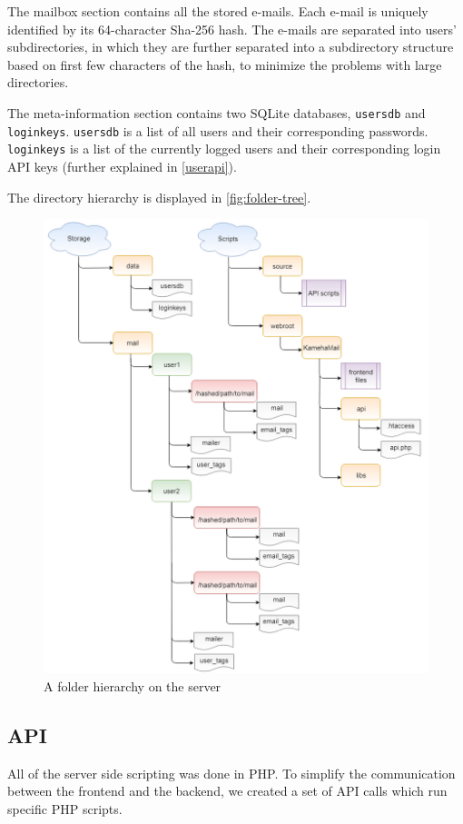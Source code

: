 The mailbox section contains all the stored e-mails. Each e-mail is uniquely identified by its 64-character Sha-256 hash. The e-mails are separated into users' subdirectories, in which they are further separated into a subdirectory structure based on first few characters of the hash, to minimize the problems with large directories.

The meta-information section contains two SQLite databases, \texttt{usersdb} and \texttt{loginkeys}. \texttt{usersdb} is a list of all users and their corresponding passwords. \texttt{loginkeys} is a list of the currently logged users and their corresponding login API keys (further explained in \autoref{userapi}).

The directory hierarchy is displayed in \autoref{fig:folder-tree}.
 \begin{figure}
\centering
\includegraphics[width=\textwidth]{img/folder_tree.png}
\caption{A folder hierarchy on the server}
\label{fig:folder-tree}
\end{figure}

\subsection{API}
All of the server side scripting was done in PHP. To simplify the communication between the frontend and the backend, we created a set of API calls which run specific PHP scripts.

